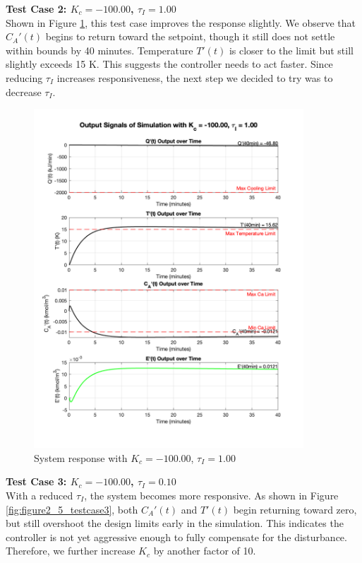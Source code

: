 \documentclass[12pt]{article}
\begin{document}
\begin{enumerate}
\begin{enumerate}
    \clearpage
    \textbf{Test Case 2: $K_c = -100.00$, $\tau_I = 1.00$} \\
    Shown in Figure \ref{fig:figure2_5_testcase2}, this test case improves the response slightly. We observe that $C_A'(t)$ begins to return toward the setpoint, though it still does not settle within bounds by 40 minutes. Temperature $T'(t)$ is closer to the limit but still slightly exceeds 15 K. This suggests the controller needs to act faster. Since reducing $\tau_I$ increases responsiveness, the next step we decided to try was to decrease $\tau_I$.
    
    \begin{figure}[H]
      \centering
      \includegraphics[width=0.900\textwidth]{Figures/figure2_5_testcase2.png}
      \caption{System response with $K_c = -100.00$, $\tau_I = 1.00$}
      \label{fig:figure2_5_testcase2}
    \end{figure}
    
    \clearpage
    \textbf{Test Case 3: $K_c = -100.00$, $\tau_I = 0.10$} \\
    With a reduced $\tau_I$, the system becomes more responsive. As shown in Figure \ref{fig:figure2_5_testcase3}, both $C_A'(t)$ and $T'(t)$ begin returning toward zero, but still overshoot the design limits early in the simulation. This indicates the controller is not yet aggressive enough to fully compensate for the disturbance. Therefore, we further increase $K_c$ by another factor of 10.
    

\end{enumerate}
\end{enumerate}
\end{document}
